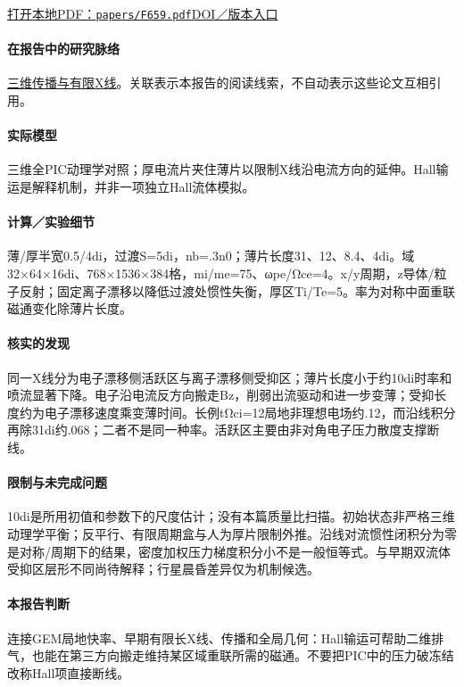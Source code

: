 \documentclass[UTF8,a4paper,11pt,openany,fontset=fandol]{ctexbook}
\begin{document}
\href{run:../papers/F659.pdf}{打开本地PDF：\texttt{papers/F659.pdf}}\quad\href{https://doi.org/10.1029/2019ja026539}{DOI／版本入口}

\paragraph{在报告中的研究脉络}\hyperref[story:three]{三维传播与有限X线}。关联表示本报告的阅读线索，不自动表示这些论文互相引用。

\paragraph{实际模型}三维全PIC动理学对照；厚电流片夹住薄片以限制X线沿电流方向的延伸。Hall输运是解释机制，并非一项独立Hall流体模拟。

\paragraph{计算／实验细节}薄/厚半宽0.5/4di，过渡S=5di，nb=.3n0；薄片长度31、12、8.4、4di。域32×64×16di、768×1536×384格，mi/me=75、ωpe/Ωce=4。x/y周期，z导体/粒子反射；固定离子漂移以降低过渡处惯性失衡，厚区Ti/Te=5。率为对称中面重联磁通变化除薄片长度。

\paragraph{核实的发现}同一X线分为电子漂移侧活跃区与离子漂移侧受抑区；薄片长度小于约10di时率和喷流显著下降。电子沿电流反方向搬走Bz，削弱出流驱动和进一步变薄；受抑长度约为电子漂移速度乘变薄时间。长例tΩci=12局地非理想电场约.12，而沿线积分再除31di约.068；二者不是同一种率。活跃区主要由非对角电子压力散度支撑断线。

\paragraph{限制与未完成问题}10di是所用初值和参数下的尺度估计；没有本篇质量比扫描。初始状态非严格三维动理学平衡；反平行、有限周期盒与人为厚片限制外推。沿线对流惯性闭积分为零是对称/周期下的结果，密度加权压力梯度积分小不是一般恒等式。与早期双流体受抑区层形不同尚待解释；行星晨昏差异仅为机制候选。

\paragraph{本报告判断}连接GEM局地快率、早期有限长X线、传播和全局几何：Hall输运可帮助二维排气，也能在第三方向搬走维持某区域重联所需的磁通。不要把PIC中的压力破冻结改称Hall项直接断线。
\end{document}
